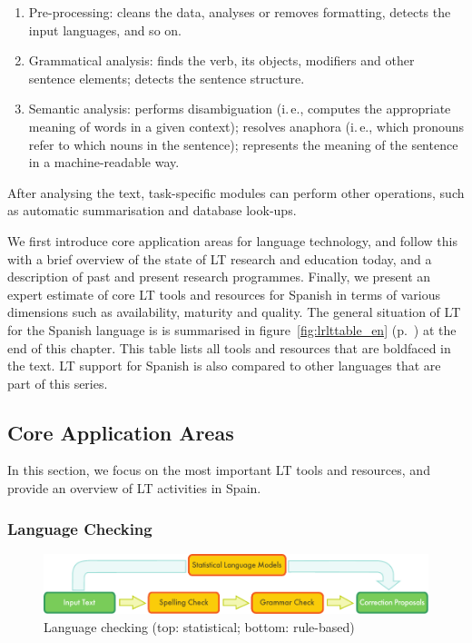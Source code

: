 \begin{multicols}{2}
\begin{enumerate}
\item Pre-processing: cleans the data, analyses or removes formatting, detects the input languages, and so on.
\item Grammatical analysis: finds the verb, its objects, modifiers and other sentence elements; detects the sentence structure.
\item Semantic analysis: performs disambiguation (i.\,e., computes the appropriate meaning of words in a given context); resolves anaphora (i.\,e., which pronouns refer to which nouns in the sentence); represents the meaning of the sentence in a machine-readable way.
\end{enumerate}

After analysing the text, task-specific modules can perform other operations, such as automatic summarisation and database look-ups.

We first introduce core application areas for language technology, and follow this with a brief overview of the state of LT research and education today, and a description of past and present research programmes. Finally, we present an expert estimate of core LT tools and resources for Spanish in terms of various dimensions such as availability, maturity and quality. The general situation of LT for the Spanish language is is summarised in figure~\ref{fig:lrlttable_en} (p.~\pageref{fig:lrlttable_en}) at the end of this chapter. This table lists all tools and resources that are boldfaced in the text. LT support for Spanish is also compared to other languages that are part of this series.

\subsection{Core Application Areas}

In this section, we focus on the most important LT tools and resources, and provide an overview of LT activities in Spain.

\subsubsection{Language Checking}

\begin{figure}[t]
  \center
  \includegraphics[width=\textwidth]{../_media/english/language_checking}
  \caption{Language checking (top: statistical; bottom: rule-based)}
\label{fig:langcheckingaarch_en}
\end{figure}


\end{multicols}
